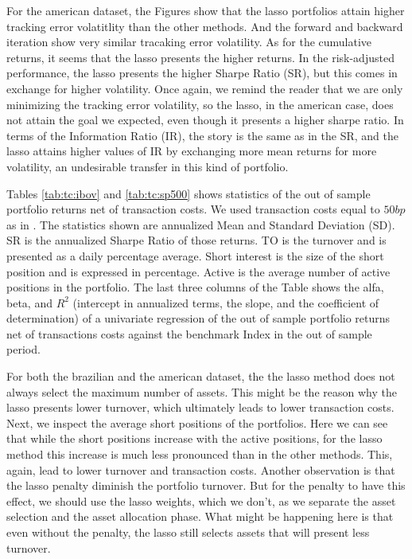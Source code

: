 \documentclass[preprint, doubleblind, authoryear,10pt]{elsarticle}
\begin{document}
For the american dataset, the Figures show that the lasso portfolios attain higher tracking error volatitlity than the other methods.
And the forward and backward iteration show very similar tracaking error volatility.
As for the cumulative returns, it seems that the lasso presents the higher returns.
In the risk-adjusted performance, the lasso presents the higher Sharpe Ratio (SR), but this comes in exchange for higher volatility.
Once again, we remind the reader that we are only minimizing the tracking error volatility, so the lasso, in the american case, does not attain the goal we expected, even though it presents a higher sharpe ratio.
In terms of the Information Ratio (IR), the story is the same as in the SR, and the lasso attains higher values of IR by exchanging more mean returns for more volatility, an undesirable transfer in this kind of portfolio.


Tables \ref{tab:tc:ibov} and \ref{tab:tc:sp500} shows statistics of the out of sample portfolio returns net of transaction costs.
We used transaction costs equal to $50bp$ as in \cite{dgu2009}.
The statistics shown are annualized Mean and Standard Deviation (SD).
SR is the annualized Sharpe Ratio of those returns.
TO is the turnover and is presented as a daily percentage average.
Short interest is the size of the short position and is expressed in percentage.
Active is the average number of active positions in the portfolio.
The last three columns of the Table shows the alfa, beta, and $R^2$ (intercept in annualized terms, the slope, and the coefficient of determination) of a univariate regression of the out of sample portfolio returns net of transactions costs against the benchmark Index in the out of sample period.

For both the brazilian and the american dataset, the the lasso method does not always select the maximum number of assets.
This might be the reason why the lasso presents lower turnover, which ultimately leads to lower transaction costs.
Next, we inspect the average short positions of the portfolios.
Here we can see that while the short positions increase with the active positions, for the lasso method this increase is much less pronounced than in the other methods.
This, again, lead to lower turnover and transaction costs.
Another observation is that the lasso penalty diminish the portfolio turnover.
But for the penalty to have this effect, we should use the lasso weights, which we don't, as we separate the asset selection and the asset allocation phase.
What might be happening here is that even without the penalty, the lasso still selects assets that will present less turnover.
\end{document}
